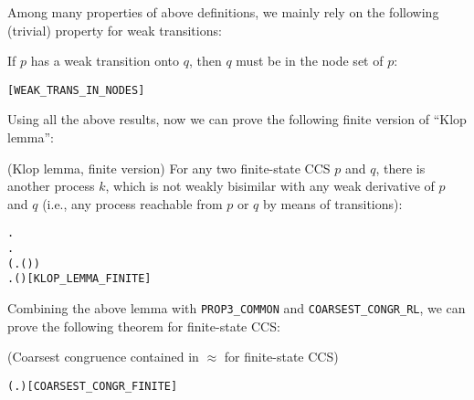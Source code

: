 Among many properties of above definitions, we mainly rely on the
following (trivial) property for weak transitions:
\begin{proposition}
If $p$ has a weak transition onto $q$, then $q$ must be in the node set of $p$:
\begin{alltt}
\HOLTokenTurnstile{}  \HOLTokenWeakTransBegin{}\HOLTokenImp{}  \HOLSymConst{\HOLTokenImp{}}  \HOLSymConst{\HOLTokenIn{}}  \hfill[WEAK_TRANS_IN_NODES]
\end{alltt}
\end{proposition}

Using all the above results, now we can  prove the following finite
version of ``Klop lemma'':
\begin{lemma}{(Klop lemma,  finite version)}
\label{lem:klop-lemma-finite}
For any two finite-state CCS $p$ and $q$, there is another process
$k$, which is not weakly bisimilar 
with
 any weak derivative  of $p$
and $q$ (i.e., any process reachable from $p $ or $q$ by means of transitions):
\begin{alltt}
\HOLTokenTurnstile{} \HOLSymConst{\HOLTokenForall{}} .
         \HOLSymConst{\HOLTokenConj{}}   \HOLSymConst{\HOLTokenImp{}}
       \HOLSymConst{\HOLTokenExists{}}.
             \HOLSymConst{\HOLTokenConj{}} (\HOLSymConst{\HOLTokenForall{}} .  \HOLTokenWeakTransBegin{}\HOLTokenImp{}  \HOLSymConst{\HOLTokenImp{}} \HOLSymConst{\HOLTokenNeg{}}( \HOLSymConst{\HOLTokenWeakEQ} )) \HOLSymConst{\HOLTokenConj{}}
           \HOLSymConst{\HOLTokenForall{}} .  \HOLTokenWeakTransBegin{}\HOLTokenImp{}  \HOLSymConst{\HOLTokenImp{}} \HOLSymConst{\HOLTokenNeg{}}( \HOLSymConst{\HOLTokenWeakEQ} )\hfill{[KLOP_LEMMA_FINITE]}
\end{alltt}
\end{lemma}

Combining the above lemma with \texttt{PROP3_COMMON} and \texttt{COARSEST_CONGR_RL},
we can  prove the following theorem for finite-state CCS:
\begin{theorem}{(Coarsest congruence contained in $\approx$ for
    finite-state CCS)}
\begin{alltt}
\HOLTokenTurnstile{}   \HOLSymConst{\HOLTokenConj{}}   \HOLSymConst{\HOLTokenImp{}}
   ( \HOLSymConst{\HOLTokenObsCongr}  \HOLSymConst{\HOLTokenEquiv{}} \HOLSymConst{\HOLTokenForall{}}.  \HOLSymConst{\ensuremath{+}}  \HOLSymConst{\HOLTokenWeakEQ}  \HOLSymConst{\ensuremath{+}} )\hfill[COARSEST_CONGR_FINITE]
\end{alltt}
\end{theorem}

